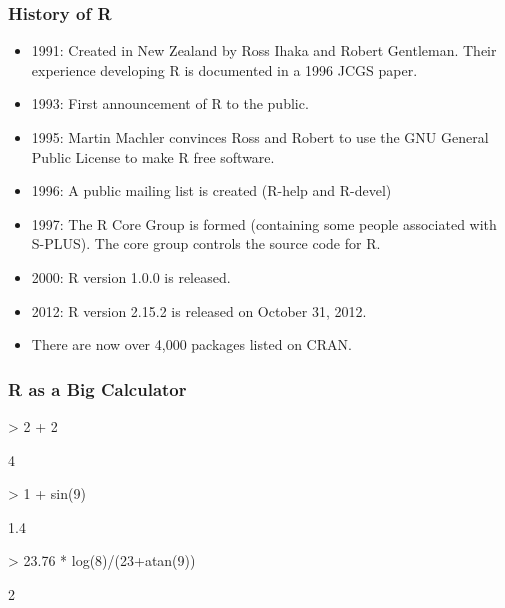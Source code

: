 \documentclass[10pt,slidestop,mathserif,c]{beamer}
\begin{document}
\begin{frame}[c]
	\frametitle{History of R}
	\begin{itemize}
	\item 1991: Created in New Zealand by Ross Ihaka and Robert Gentleman. Their experience developing R is documented in a 1996 JCGS paper.
	\item 1993: First announcement of R to the public.
	\item 1995: Martin Machler convinces Ross and Robert to use the GNU General Public License to make R free software.
	\item 1996: A public mailing list is created (R-help and R-devel)
	\item 1997: The R Core Group is formed (containing some people associated with S-PLUS). The core group controls the source code for R.
	\item 2000: R version 1.0.0 is released.
	\item 2012: R version 2.15.2 is released on October 31, 2012.
	\item There are now over 4,000 packages listed on CRAN. 
	\end{itemize}
\end{frame}

\begin{frame}
	\frametitle{R as a Big Calculator}
\begin{Schunk}
\begin{Sinput}
> 2 + 2
\end{Sinput}
\begin{Soutput}
[1] 4
\end{Soutput}
\end{Schunk}
\pause
\begin{Schunk}
\begin{Sinput}
> 1 + sin(9)
\end{Sinput}
\begin{Soutput}
[1] 1.4
\end{Soutput}
\end{Schunk}
\pause
\begin{Schunk}
\begin{Sinput}
> 23.76 * log(8)/(23+atan(9))
\end{Sinput}
\begin{Soutput}
[1] 2
\end{Soutput}
\end{Schunk}
\end{frame}
\end{document}
